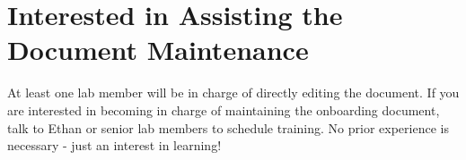 \documentclass[
]{book}
\begin{document}
\hypertarget{interested-in-assisting-the-document-maintenance}{%
\section{Interested in Assisting the Document Maintenance}\label{interested-in-assisting-the-document-maintenance}}

At least one lab member will be in charge of directly editing the document. If you are interested in becoming in charge of maintaining the onboarding document, talk to Ethan or senior lab members to schedule training. No prior experience is necessary - just an interest in learning!
\end{document}

